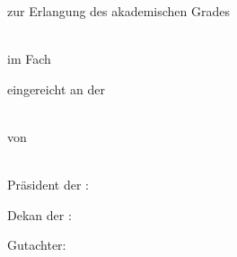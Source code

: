 \makeatletter
\begin{titlepage}
\begin{spacing}{1}
  \setlength{\parindentbak}{\parindent}
  \setlength{\parskipbak}{\parskip}

\setlength{\parindent}{0pt}
\setlength{\parskip}{\baselineskip}

\thispagestyle{empty}

\expandafter\Hu@titlepagefont\expandafter

\begin{center}
{\LARGE \textbf{\ifx\Hu@doctitle\empty{}\else\Hu@doctitle\fi}}

\ifx\Hu@docsubtitle\empty{}\else\Hu@docsubtitle\fi


zur Erlangung des akademischen Grades

\ifx\Hu@degree\empty{}\else\Hu@degree\fi\\
im Fach
\ifx\Hu@subject\empty{}\else\Hu@subject\fi

eingereicht an der\\
\ifx\Hu@faculty\empty{}\else\Hu@faculty\fi\\
\ifx\Hu@university\empty{}\else\Hu@university\fi

von\\
\textbf{\ifx\Hu@authorprefix\empty{}\else\Hu@authorprefix\fi\ \ifx\Hu@authorfirstname\empty{}\else\Hu@authorfirstname\fi\ \ifx\Hu@authorsurname\empty{}\else\Hu@authorsurname\fi\ \ifx\Hu@authorsuffix\empty{}\else\Hu@authorsuffix\fi}\\
\ifx\Hu@authoradd\empty{}\else\Hu@authoradd\fi
\end{center}

\vfill

Pr\"asident der \ifx\Hu@university\empty{}\else\Hu@university\fi:\\
\ifx\Hu@president\empty{}\else\Hu@president\fi

Dekan der \ifx\Hu@faculty\empty{}\else\Hu@faculty\fi:\\
\ifx\Hu@dean\empty{}\else\Hu@dean\fi

Gutachter:
\begin{tplist} 
  \ifx\Hu@approvala\empty\item {}\else\item \Hu@approvala\fi
  \ifx\Hu@approvalb\empty\else\item \Hu@approvalb\fi
  \ifx\Hu@approvalc\empty\else\item \Hu@approvalc\fi
  \ifx\Hu@approvald\empty\else\item \Hu@approvald\fi
  \ifx\Hu@approvale\empty\else\item \Hu@approvale\fi
\end{tplist}


\end{spacing}
\end{titlepage}

